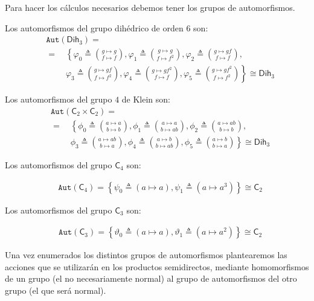 \documentclass[12pt,a4paper,fleqn,spanish,final,openright]{extbook}
\theoremstyle{definition}
\theoremstyle{remark}
\begin{document}
Para hacer los cálculos necesarios debemos tener los grupos de automorfismos.

Los automorfismos del grupo dihédrico de orden $6$ son:
\begin{align}
&\texttt{Aut}(\mathsf{Dih}_{3})=\nonumber\\
&=\quad
    \left\lbrace \right.
        \varphi_0\triangleq\binom{g   \mapsto g}{f   \mapsto f},
        \varphi_1\triangleq\binom{g   \mapsto g}{f   \mapsto f^2},
        \varphi_2\triangleq\binom{g   \mapsto gf}{f   \mapsto f},\nonumber\\
&\phantom{=}\quad\varphi_3\triangleq\binom{g   \mapsto gf}{f   \mapsto f^2},
	\varphi_4\triangleq\binom{g   \mapsto gf^2}{f
	   \mapsto f}, \varphi_5\triangleq\binom{g   \mapsto gf^2}{f   \mapsto f^2}
    \left. \right\rbrace\nonumber    \cong    \mathsf{Dih}_{3}
\end{align}

Los automorfismos del grupo $4$ de Klein son:
\begin{align}
&\texttt{Aut}(\mathsf{C}_{2}   \times   \mathsf{C}_{2})=\nonumber\\
&=\quad
	\left\lbrace \right.
	\phi_0\triangleq\binom{a   \mapsto a}{b   \mapsto b},
	\phi_1\triangleq\binom{a   \mapsto a}{b   \mapsto ab},
	\phi_2\triangleq\binom{a   \mapsto ab}{b   \mapsto b},\nonumber\\
&\phantom{=}\quad
	\phi_3\triangleq\binom{a   \mapsto ab}{b   \mapsto a},
	\phi_4\triangleq\binom{a   \mapsto b}{b   \mapsto ab},
	\phi_5\triangleq\binom{a   \mapsto b}{b   \mapsto a}
	\left. \right\rbrace\nonumber    \cong    \mathsf{Dih}_{3}
\end{align}

Los automorfismos del grupo $\mathsf{C}_{4}$ son:

\begin{align}
&\texttt{Aut}(\mathsf{C}_{4})=
	\left\lbrace
		\psi_0\triangleq\left({a   \mapsto a}\right),
		\psi_1\triangleq\left({a   \mapsto a^3}\right)
	\right\rbrace
	   \cong    \mathsf{C}_{2}
\end{align}

Los automorfismos del grupo $\mathsf{C}_{3}$ son:

\begin{align}
&\texttt{Aut}(\mathsf{C}_{3})=
\left\lbrace
	\vartheta_0\triangleq\left({a   \mapsto a}\right),
	\vartheta_1\triangleq\left({a   \mapsto a^2}\right)
\right\rbrace
   \cong    \mathsf{C}_{2}
\end{align}

Una vez enumerados los distintos grupos de automorfismos plantearemos las acciones
que se utilizarán en los productos semidirectos, mediante homomorfismos de un grupo
(el no necesariamente normal) al grupo de automorfismos del otro grupo
(el que será normal).
\end{document}
